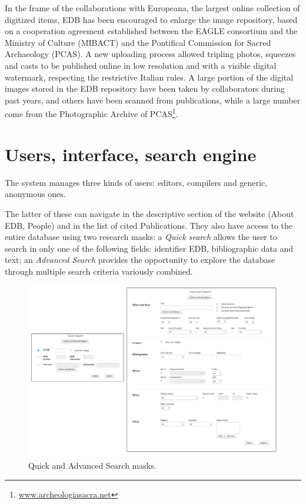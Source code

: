 \documentclass[amsthm,ebook]{saparticle}
\begin{document}
In the frame of the collaborations with Europeana, the largest online collection of digitized items, EDB has been
encouraged to enlarge the image repository, based on a cooperation agreement established between the EAGLE consortium
and the Ministry of Culture (MIBACT) and the Pontifical Commission for Sacred Archaeology (PCAS). A new uploading
process allowed tripling photos, squeezes and casts to be published online in low resolution and with a visible digital
watermark, respecting the restrictive Italian rules. A large portion of the digital images stored in the EDB repository
have been taken by collaborators during past years, and others have been scanned from publications, while a large
number come from the Photographic Archive of PCAS\footnote{ \url{www.archeologiasacra.net}}.




\section{Users, interface, search engine}





The system manages three kinds of users: editors, compilers and generic, anonymous ones.

The latter of these can navigate in the descriptive section of the website (About EDB, People) and in the list of cited
Publications. They also have access to the entire database using two research masks: a \emph{Quick search} allows the user to
search in only one of the following fields: identifier EDB, bibliographic data and text; an \emph{Advanced Search} provides
the opportunity to explore the database through multiple search criteria variously combined.

\begin{figure}[hbp]
\centering
 \includegraphics[width=\columnwidth]{EAGLE2016Roccoengrev-img011.png}
\caption{Quick and Advanced Search masks.}
\label{fig:11}
\end{figure}
 
\end{document}
